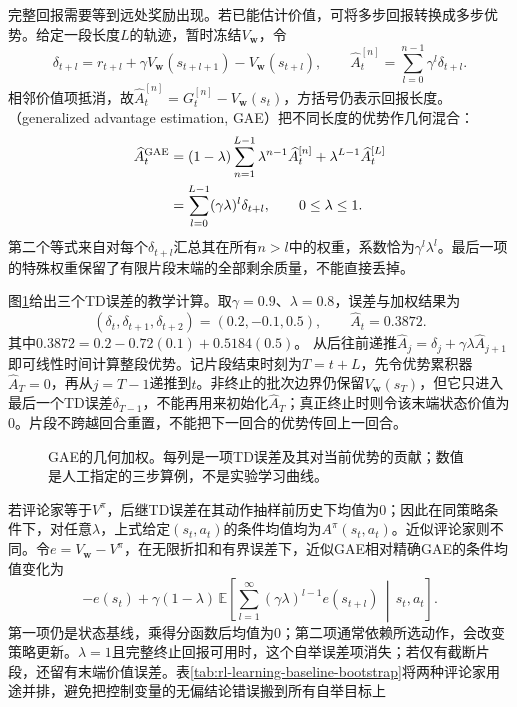 完整回报需要等到远处奖励出现。若已能估计价值，可将多步回报转换成多步优势。给定一段长度$L$的轨迹，暂时冻结$V_{\bm w}$，令
\[
  \delta_{t+l}=r_{t+l}+\gamma V_{\bm w}(s_{t+l+1})
                            -V_{\bm w}(s_{t+l}),\qquad
  \widehat A_t^{[n]}=\sum_{l=0}^{n-1}\gamma^l\delta_{t+l}.
\]
相邻价值项抵消，故$\widehat A_t^{[n]}=G_t^{[n]}-V_{\bm w}(s_t)$，方括号仍表示回报长度。（generalized advantage estimation, GAE）把不同长度的优势作几何混合：
\begin{align}
  \widehat A_t^{\mathrm{GAE}}
    &=(1-\lambda)\sum_{n=1}^{L-1}\lambda^{n-1}\widehat A_t^{[n]}
       +\lambda^{L-1}\widehat A_t^{[L]}
       \notag\\
    &=\sum_{l=0}^{L-1}(\gamma\lambda)^l\delta_{t+l},
       \qquad 0\leq\lambda\leq1.
    \label{eq:rl-learning-gae}
\end{align}
第二个等式来自对每个$\delta_{t+l}$汇总其在所有$n>l$中的权重，系数恰为$\gamma^l\lambda^l$。最后一项的特殊权重保留了有限片段末端的全部剩余质量，不能直接丢掉。

图\ref{fig:rl-learning-gae}给出三个TD误差的教学计算。取$\gamma=0.9$、$\lambda=0.8$，误差与加权结果为
\[
  (\delta_t,\delta_{t+1},\delta_{t+2})=(0.2,-0.1,0.5),\qquad
  \widehat A_t=0.3872.
\]
其中$0.3872=0.2-0.72(0.1)+0.5184(0.5)$。
从后往前递推$\widehat A_j=\delta_j+\gamma\lambda\widehat A_{j+1}$即可线性时间计算整段优势。记片段结束时刻为$T=t+L$，先令优势累积器$\widehat A_T=0$，再从$j=T-1$递推到$t$。非终止的批次边界仍保留$V_{\bm w}(s_T)$，但它只进入最后一个TD误差$\delta_{T-1}$，不能再用来初始化$\widehat A_T$；真正终止时则令该末端状态价值为0。片段不跨越回合重置，不能把下一回合的优势传回上一回合。

\begin{figure}[htbp]
  \centering
  
  \caption{GAE的几何加权。每列是一项TD误差及其对当前优势的贡献；数值是人工指定的三步算例，不是实验学习曲线。}
  \label{fig:rl-learning-gae}
\end{figure}

若评论家等于$V^\pi$，后继TD误差在其动作抽样前历史下均值为0；因此在同策略条件下，对任意$\lambda$，上式给定$(s_t,a_t)$的条件均值均为$A^\pi(s_t,a_t)$。近似评论家则不同。令$e=V_{\bm w}-V^\pi$，在无限折扣和有界误差下，近似GAE相对精确GAE的条件均值变化为
\[
  -e(s_t)+
  \gamma(1-\lambda)\,
  \mathbb E\left[
     \sum_{l=1}^{\infty}(\gamma\lambda)^{l-1}e(s_{t+l})
        \,\middle|\,s_t,a_t\right].
\]
第一项仍是状态基线，乘得分函数后均值为0；第二项通常依赖所选动作，会改变策略更新。$\lambda=1$且完整终止回报可用时，这个自举误差项消失；若仅有截断片段，还留有末端价值误差。表\ref{tab:rl-learning-baseline-bootstrap}将两种评论家用途并排，避免把控制变量的无偏结论错误搬到所有自举目标上

